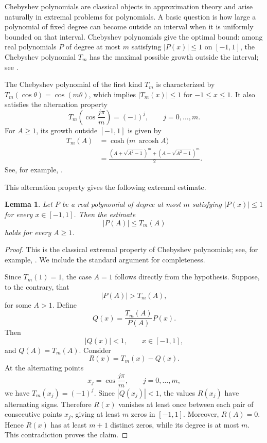 \documentclass[11pt]{article}
\newtheorem{lemma}[theorem]{Lemma}
\theoremstyle{definition}
\begin{document}
Chebyshev polynomials are classical objects in approximation theory and arise
naturally in extremal problems for polynomials.  A basic question is how large
a polynomial of fixed degree can become outside an interval when it is
uniformly bounded on that interval.  Chebyshev polynomials give the optimal
bound: among real polynomials \(P\) of degree at most \(m\) satisfying
\(|P(x)|\le1\) on \([-1,1]\), the Chebyshev polynomial \(T_m\) has the
maximal possible growth outside the interval; see
\cite{Rivlin,SachdevaVishnoi}.

The Chebyshev polynomial of the first kind \(T_m\) is characterized by
\(T_m(\cos\theta)=\cos(m\theta)\), which implies
\(|T_m(x)|\le1\) for \(-1\le x\le1\).  It also satisfies the
alternation property
\[
	T_m\left(\cos\frac{j\pi}{m}\right)=(-1)^j,
	\qquad j=0,\ldots,m.
\]
For \(A\ge1\), its growth outside \([-1,1]\) is given by
\begin{equation}\label{eq:chebyshev-formula}
	\begin{aligned}
		T_m(A)
		&=\cosh\bigl(m\,\operatorname{arcosh}A\bigr)\\
		&=
		\frac{(A+\sqrt{A^2-1})^m+
			(A-\sqrt{A^2-1})^m}{2}.
	\end{aligned}
\end{equation}
See, for example, \cite[Proposition~2.5]{SachdevaVishnoi}.

This alternation property gives the following
extremal estimate.

\begin{lemma}\label{lem:chebyshev-extremal}
Let \(P\) be a real polynomial of degree at most \(m\) satisfying
\(|P(x)|\le1\) for every \(x\in[-1,1]\).  Then the estimate
\begin{equation*}
 |P(A)|\le T_m(A)
\end{equation*}
holds for every \(A\ge1\).
\end{lemma}

\begin{proof}This is the classical extremal property of Chebyshev polynomials; see, for
example, \cite[Proposition~2.4]{SachdevaVishnoi}.  We include the standard argument for
completeness.

Since \(T_m(1)=1\), the case \(A=1\) follows directly from the hypothesis.
Suppose, to the contrary, that
\[
|P(A)|>T_m(A),
\]
for some \(A>1\).  Define
\[
Q(x)=\frac{T_m(A)}{P(A)}P(x).
\]
Then
\[
|Q(x)|<1,\qquad x\in[-1,1],
\]
and
\(
Q(A)=T_m(A).
\)
Consider
\[
R(x)=T_m(x)-Q(x).
\]
At the alternating points
\[
x_j=\cos\frac{j\pi}{m},
\qquad j=0,\ldots,m,
\]
we have
\(
T_m(x_j)=(-1)^j.
\)
Since \(|Q(x_j)|<1\), the values \(R(x_j)\) have alternating signs.
Therefore \(R(x)\) vanishes at least once between each pair of consecutive
points \(x_j\), giving at least \(m\) zeros in \([-1,1]\).  Moreover,
\(
R(A)=0.
\)
Hence \(R(x)\) has at least \(m+1\) distinct zeros, while its degree is at
most \(m\).  This contradiction proves the claim.
\end{proof}
\end{document}
